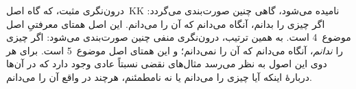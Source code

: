 \documentclass[../../../include/open-logic-section]{subfiles}
\begin{document}
درون‌نگری مثبت، که گاه اصل~KK نامیده می‌شود، گاهی چنین صورت‌بندی
می‌گردد: اگر چیزی را بدانم، آنگاه می‌دانم که آن را می‌دانم. این اصل
همتای معرفتیِ اصل موضوع~4 است. به همین ترتیب، درون‌نگری منفی چنین
صورت‌بندی می‌شود: اگر چیزی را \emph{ندانم}، آنگاه می‌دانم که آن را
نمی‌دانم؛ و این همتای اصل موضوع~5 است. برای هر دوی این اصول به نظر
می‌رسد مثال‌های نقضی نسبتاً عادی وجود دارد که در آن‌ها دربارهٔ اینکه
آیا چیزی را می‌دانم یا نه نامطمئنم، هرچند در واقع آن را می‌دانم.
\end{document}
